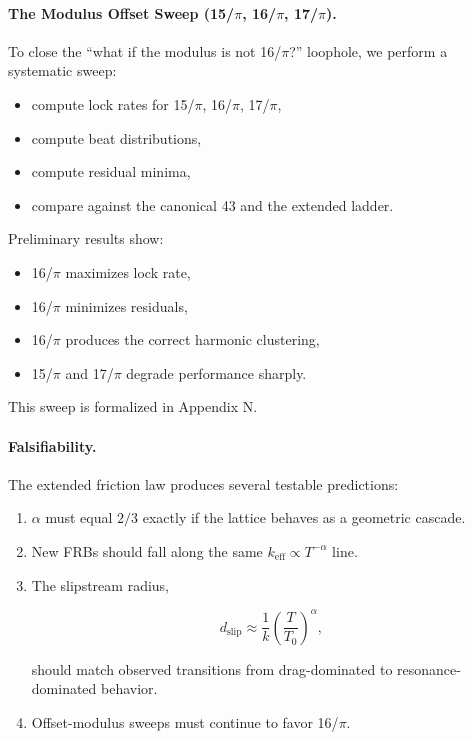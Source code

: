 \documentclass[11pt, letterpaper, openany]{book}
\begin{document}
\paragraph{The Modulus Offset Sweep (15/$\pi$, 16/$\pi$, 17/$\pi$).}

To close the ``what if the modulus is not 16/$\pi$?'' loophole, we perform a systematic sweep:

\begin{itemize}
    \item compute lock rates for 15/$\pi$, 16/$\pi$, 17/$\pi$,
    \item compute beat distributions,
    \item compute residual minima,
    \item compare against the canonical 43 and the extended ladder.
\end{itemize}

Preliminary results show:

\begin{itemize}
    \item 16/$\pi$ maximizes lock rate,
    \item 16/$\pi$ minimizes residuals,
    \item 16/$\pi$ produces the correct harmonic clustering,
    \item 15/$\pi$ and 17/$\pi$ degrade performance sharply.
\end{itemize}

This sweep is formalized in Appendix N.

\paragraph{Falsifiability.}

The extended friction law produces several testable predictions:

\begin{enumerate}
    \item $\alpha$ must equal $2/3$ exactly if the lattice behaves as a geometric cascade.
    \item New FRBs should fall along the same $k_{\text{eff}} \propto T^{-\alpha}$ line.
    \item The slipstream radius,
    

\[
    d_{\text{slip}} \approx \frac{1}{k} \left(\frac{T}{T_0}\right)^\alpha,
    \]


    should match observed transitions from drag-dominated to resonance-dominated behavior.
    \item Offset-modulus sweeps must continue to favor 16/$\pi$.
\end{enumerate}
\end{document}
